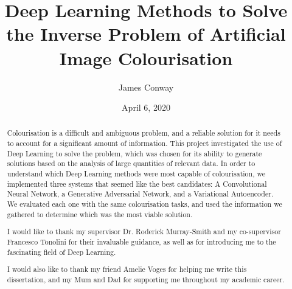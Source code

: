 \documentclass{l4proj}
\begin{document}
\title{Deep Learning Methods to Solve the Inverse Problem of Artificial Image Colourisation}
\author{James Conway}
\date{April 6, 2020}

\maketitle



\begin{abstract}
    Colourisation is a difficult and ambiguous problem, and a reliable solution for it needs to account for a significant amount of information. This project investigated the use of Deep Learning to solve the problem, which was chosen for its ability to generate solutions based on the analysis of large quantities of relevant data. In order to understand which Deep Learning methods were most capable of colourisation, we implemented three systems that seemed like the best candidates: A Convolutional Neural Network, a Generative Adversarial Network, and a Variational Autoencoder. We evaluated each one with the same colourisation tasks, and used the information we gathered to determine which was the most viable solution.
\end{abstract}

\renewcommand{\abstractname}{Acknowledgements}
\begin{abstract}
    I would like to thank my supervisor Dr. Roderick Murray-Smith and my co-supervisor Francesco Tonolini for their invaluable guidance, as well as for introducing me to the fascinating field of Deep Learning.
    
    I would also like to thank my friend Amelie Voges for helping me write this dissertation, and my Mum and Dad for supporting me throughout my academic career.
\end{abstract}
\end{document}
